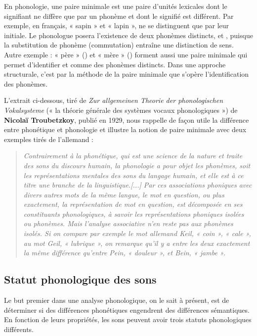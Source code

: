 En phonologie, une paire minimale est une paire d’unités lexicales dont le signifiant ne diffère que par un phonème et dont le signifié est différent. Par exemple, en français, « sapin » et « lapin », ne se distinguent que par leur initiale. Le phonologue posera l’existence de deux phonèmes distincts,  et , puisque la substitution de phonème (commutation) entraîne une distinction de sens. Autre exemple : « père » (\bipa{[pɛʁ]}) et « mère » (\bipa{[mɛʁ]}) forment aussi une paire minimale qui permet d’identifier  et  comme des phonèmes distincts. Dans une approche structurale, c’est par la méthode de la paire minimale que s’opère l’identification des phonèmes.

L’extrait ci-dessous, tiré de \textit{Zur allgemeinen Theorie der phonologischen Vokalsysteme} (« la théorie générale des systèmes vocaux phonologiques ») de \textbf{Nicolaï Troubetzkoy}, publié en 1929, nous rappelle de façon utile la différence entre phonétique et phonologie et illustre la notion de paire minimale avec deux exemples tirés de l’allemand :
\begin{quote}\small\itshape
Contrairement à la phonétique, qui est une science de la nature et traite des sons du discours humain, la phonologie a pour objet les phonèmes, soit les représentations mentales des sons du langage humain, et elle est à ce titre une branche de la linguistique.[...] Par ces associations phoniques avec divers autres mots de la même langue, le mot en question, ou plus exactement, la représentation de mot en question, est décomposée en ses constituants phonologiques, à savoir les représentations phoniques isolées ou phonèmes. Mais l’analyse associative n’en reste pas aux phonèmes isolés. Si on compare par exemple le mot allemand Keil, « coin », « cale », au mot Geil, « lubrique », on remarque qu’il y a entre les deux exactement la même différence qu’entre Pein, « douleur », et Bein, « jambe ».
\end{quote}

\subsection{Statut phonologique des sons}
Le but premier dans une analyse phonologique, on le sait à présent, est de déterminer si des différences phonétiques engendrent des différences sémantiques. En fonction de leurs propriétés, les sons peuvent avoir trois statuts phonologiques différents.

